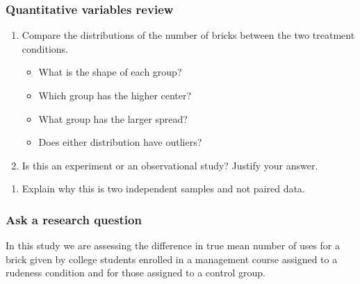 \documentclass[
]{report}
\providecommand{\tightlist}{%
  \setlength{\itemsep}{0pt}\setlength{\parskip}{0pt}}
\begin{document}
\subsubsection*{Quantitative variables review}\label{quantitative-variables-review}

\begin{enumerate}
\def\labelenumi{\arabic{enumi}.}
\item
  Compare the distributions of the number of bricks between the two treatment conditions.

  \begin{itemize}
  \item
    What is the shape of each group?
    \vspace{0.3in}
  \item
    Which group has the higher center?
    \vspace{0.3in}
  \item
    What group has the larger spread?
    \vspace{0.3in}
  \item
    Does either distribution have outliers?
    \vspace{.3in}
  \end{itemize}
\item
  Is this an experiment or an observational study? Justify your answer.
\end{enumerate}

\vspace{1in}

\begin{enumerate}
\def\labelenumi{\arabic{enumi}.}
\setcounter{enumi}{2}
\tightlist
\item
  Explain why this is two independent samples and not paired data.
  \vspace{1in}
\end{enumerate}

\subsubsection*{Ask a research question}\label{ask-a-research-question}

In this study we are assessing the difference in true mean number of uses for a brick given by college students enrolled in a management course assigned to a rudeness condition and for those assigned to a control group.
\end{document}
